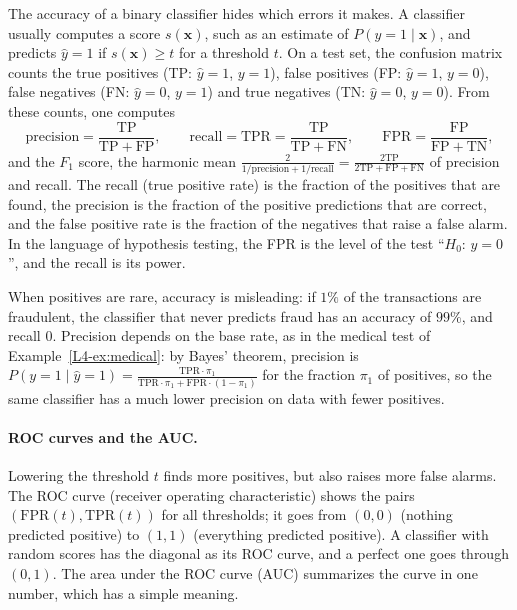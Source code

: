 The accuracy of a binary classifier hides which errors it makes. A classifier usually computes a score $s(\mathbf{x})$, such as an estimate of $P(y = 1 \mid \mathbf{x})$, and predicts $\hat y = 1$ if $s(\mathbf{x}) \geq t$ for a threshold $t$. On a test set, the confusion matrix counts the true positives (TP: $\hat y = 1$, $y = 1$), false positives (FP: $\hat y = 1$, $y = 0$), false negatives (FN: $\hat y = 0$, $y = 1$) and true negatives (TN: $\hat y = 0$, $y = 0$). From these counts, one computes
\[\text{precision} = \frac{\mathrm{TP}}{\mathrm{TP} + \mathrm{FP}}, \qquad \text{recall} = \mathrm{TPR} = \frac{\mathrm{TP}}{\mathrm{TP} + \mathrm{FN}}, \qquad \mathrm{FPR} = \frac{\mathrm{FP}}{\mathrm{FP} + \mathrm{TN}},\]
and the $F_1$ score, the harmonic mean $\frac{2}{1/\text{precision} + 1/\text{recall}} = \frac{2\mathrm{TP}}{2\mathrm{TP} + \mathrm{FP} + \mathrm{FN}}$ of precision and recall. The recall (true positive rate) is the fraction of the positives that are found, the precision is the fraction of the positive predictions that are correct, and the false positive rate is the fraction of the negatives that raise a false alarm. In the language of hypothesis testing, the FPR is the level of the test ``$H_0$: $y = 0$'', and the recall is its power.

When positives are rare, accuracy is misleading: if $1\%$ of the transactions are fraudulent, the classifier that never predicts fraud has an accuracy of $99\%$, and recall $0$. Precision depends on the base rate, as in the medical test of Example~\ref{L4-ex:medical}: by Bayes' theorem, precision is $P(y = 1 \mid \hat y = 1) = \frac{\mathrm{TPR}\cdot\pi_1}{\mathrm{TPR}\cdot\pi_1 + \mathrm{FPR}\cdot(1 - \pi_1)}$ for the fraction $\pi_1$ of positives, so the same classifier has a much lower precision on data with fewer positives.

\paragraph{ROC curves and the AUC.} Lowering the threshold $t$ finds more positives, but also raises more false alarms. The ROC curve (receiver operating characteristic) shows the pairs $(\mathrm{FPR}(t), \mathrm{TPR}(t))$ for all thresholds; it goes from $(0, 0)$ (nothing predicted positive) to $(1, 1)$ (everything predicted positive). A classifier with random scores has the diagonal as its ROC curve, and a perfect one goes through $(0, 1)$. The area under the ROC curve (AUC) summarizes the curve in one number, which has a simple meaning.

